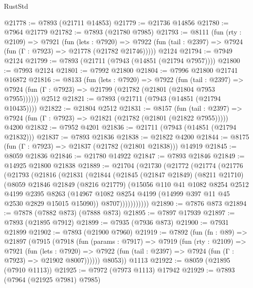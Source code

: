 \begin{lexlean}{RustStd}
\begin{coremodule}
@21778 := @7893 (@21711 @14853)
@21779 := @21736 @14856
@21780 := @7964 @21779
@21782 := @7893 (@21780 @7985)
@21793 := @8111
    (fun (rty : @2109) =>
    @7921
      (fun (lets : @7920) =>
      @7922 (fun (tail : @2397) => @7924 (fun (Γ : @7923) => @21778 (@21782 @21746)))))
    @2124
@21794 := @7949 @2124
@21799 := @7893 (@21711 (@7943 (@14851 (@21794 @7957))))
@21800 := @7993 @2124
@21801 := @7992 @21800
@21804 := @7996 @21800 @21741 @16872
@21816 := @8133
    (fun (lets : @7920) =>
    @7922
      (fun (tail : @2397) =>
      @7924 (fun (Γ : @7923) => @21799 (@21782 (@21801 (@21804 @7953 @7955))))))
    @2512
@21821 := @7893 (@21711 (@7943 (@14851 (@21794 @10435))))
@21822 := @21804 @2512
@21831 := @8157
    (fun (tail : @2397) => @7924 (fun (Γ : @7923) => @21821 (@21782 (@21801 (@21822 @7955)))))
    @4200
@21832 := @7952 @4201
@21836 := @21711 (@7943 (@14851 (@21794 @21832)))
@21837 := @7893 @21836
@21838 := @21822 @4200
@21844 := @8175 (fun (Γ : @7923) => @21837 (@21782 (@21801 @21838))) @14919
@21845 := @8059 @21836
@21846 := @21780 @14922
@21847 := @7893 @21846
@21849 := @14925 @21800 @21838
@21889 := @21704
    (@21730
      (@21772
        (@21774
          (@21776
            (@21793
              (@21816
                (@21831
                  (@21844
                    (@21845
                      (@21847 @21849)
                      (@8211 @21710)
                      (@8059
                        @21846
                        @21849
                        (@8216 @21779)
                        (@15056
                          @110
                          @41
                          @1082
                          @8254
                          @2512
                          @4199
                          @2395
                          @8263
                          (@14967 @1082 @8254 @4199 (@14999 @397 @11 @45 @2530 @2829 @15015 @15090))
                          @8707)))))))))))
@21890 := @7876 @873
@21894 := @7878 (@7882 @873) (@7888 @873)
@21895 := @7897 @17939
@21897 := @7893 (@21895 @7912)
@21899 := @7935 (@7936 @873)
@21900 := @7931 @21899
@21902 := @7893 (@21900 @7960)
@21919 := @7892
    (fun (fn : @89) =>
    @21897
      (@7915
        (@7918
          (fun (params : @7917) =>
          @7919
            (fun (rty : @2109) =>
            @7921
              (fun (lets : @7920) =>
              @7922 (fun (tail : @2397) => @7924 (fun (Γ : @7923) => @21902 @8007))))))
        @8053))
    @1113
@21922 := @8059 (@21895 (@7910 @1113))
@21925 := @7972 (@7973 @1113) @17942
@21929 := @7893 (@7964 (@21925 @7981) @7985)

\end{coremodule}
\end{lexlean}
